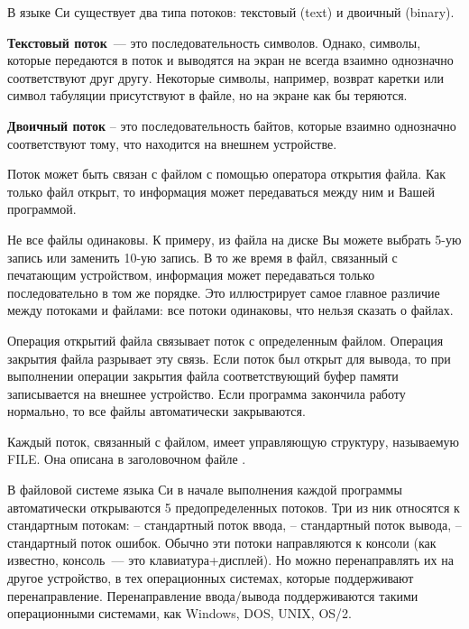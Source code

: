 В языке Си существует два типа потоков: текстовый (text) и двоичный (binary).

\textbf{Текстовый поток}~--- это последовательность символов. Однако, символы, которые передаются в поток и выводятся на экран не всегда
взаимно однозначно соответствуют друг другу. Некоторые символы, например, возврат каретки или символ табуляции присутствуют в
файле, но на экране как бы теряются.

\textbf{Двоичный поток} – это последовательность байтов, которые взаимно однозначно соответствуют тому, что находится на внешнем устройстве.

Поток может быть связан с файлом с помощью оператора открытия файла. Как только файл открыт, то информация может передаваться между ним и Вашей программой.

Не все файлы одинаковы. К примеру, из файла на диске Вы можете выбрать 5-ую запись или заменить 10-ую запись.
В то же время в файл, связанный с печатающим устройством, информация может передаваться только последовательно
в том же порядке. Это иллюстрирует самое главное различие между потоками и файлами: все потоки одинаковы, что нельзя сказать о файлах.

Операция открытий файла связывает поток с определенным файлом. Операция закрытия файла разрывает эту связь. Если поток был открыт для
вывода, то при выполнении операции закрытия файла соответствующий буфер памяти записывается на внешнее устройство. Если программа закончила
работу нормально, то все файлы автоматически закрываются.

Каждый поток, связанный с файлом, имеет управляющую структуру, называемую FILE. Она описана в заголовочном файле .

В файловой системе языка Си в начале выполнения каждой программы автоматически открываются 5 предопределенных потоков.
Три из ник относятся к стандартным потокам:  – стандартный поток ввода,  – стандартный поток
вывода,  – стандартный поток ошибок. Обычно эти потоки направляются к консоли (как известно, консоль~--- это
клавиатура+дисплей). Но можно перенаправлять их на другое устройство, в тех операционных системах, которые поддерживают
перенаправление. Перенаправление ввода/вывода поддерживаются такими операционными системами, как Windows, DOS, UNIX, OS/2.

